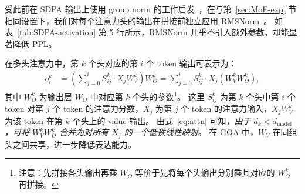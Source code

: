 \documentclass{article} %
\begin{document}
\begin{table}[t!]
\centering
\vskip  -0.25in
\caption{\footnotesize 不同（非）线性增强方法的性能。}
\vskip  -0.1in
\label{tab:SDPA-activation}
\end{table}



受此前在 SDPA 输出上使用 group norm 的工作启发~\citep{sun2023retentivenetworksuccessortransformer,ye2024differential}，在与第~\ref{sec:MoE-exp} 节相同设置下，我们对每个注意力头的输出在拼接前独立应用 RMSNorm~\citep{zhang2019root}。
如表~\ref{tab:SDPA-activation} 第 5 行所示，RMSNorm 几乎不引入额外参数，却能显著降低 PPL。

在多头注意力中，第 $k$ 个头对应的第 $i$ 个 token 输出可表示为：
\begin{align}
o^k_i &= (\sum\nolimits_{j=0}^{i} S^k_{ij}  \cdot X_j W_V^k ) W^k_O = \sum\nolimits_{j=0}^{i} S^k_{ij}  \cdot X_j (W_V^k  W^k_O),
\label{eq:attn}
\end{align}
其中 $W^k_O$ 为输出层 $W_O$ 中对应第 $k$ 个头的参数\footnote{注意：先拼接各头输出再乘 $W_O$ 等价于先将每个头输出分别乘其对应的 $W^k_O$ 再拼接。}。
这里 $S^k_{ij}$ 为第 $k$ 个头中第 $i$ 个 token 对第 $j$ 个 token 的注意力分数，$X_j$ 为第 $j$ 个 token 的注意力输入，$X_j W_V^k$ 为该 token 在第 $k$ 个头上的 value 输出。
由式~\ref{eq:attn} 可知，\textit{由于 $d_k < d_{\text{model}}$，可将 $W_V^k W^k_O$ 合并为对所有 $X_j$ 的一个低秩线性映射}。
在 GQA 中，$W_V$ 在同组头之间共享，进一步降低表达能力。
\end{document}
